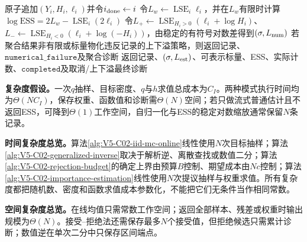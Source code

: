 \begin{AlgorithmContract}
\begin{algorithm}[t]
{  原子追加$(Y_i,H_i,\ell_i)$并令$i_{\rm done}\leftarrow i$\;
}
令$L_w\leftarrow\operatorname{LSE}_i\ell_i$，并在$L_w$有限时计算$\log\mathrm{ESS}=2L_w-\operatorname{LSE}_i(2\ell_i)$\;
令$L_+\leftarrow\operatorname{LSE}_{H_i>0}(\ell_i+\log H_i)$、$L_-\leftarrow\operatorname{LSE}_{H_i<0}(\ell_i+\log(-H_i))$，由稳定的有符号对数差得到$(\sigma,L_{\rm num})$\;
若聚合结果非有限或标量物化违反记录的上下溢策略，则返回记录、$\mathtt{numerical\_failure}$及聚合诊断\;
返回记录、$(\sigma,L_{\rm est})$、可表示标量、ESS、实际计数、$\mathtt{completed}$及取消/上下溢最终诊断\;
\end{algorithm}
\end{AlgorithmContract}
\FloatBarrier
{}
\endgroup

\textbf{复杂度假设。}一次$q$抽样、目标密度、$q$与$h$求值总成本为$C_I$。两种模式执行时间均为$\Theta(NC_I)$，保存权重、函数值和诊断需$\Theta(N)$空间；若只做流式普通估计且不返回ESS，可降到$\Theta(1)$工作空间，自归一化与ESS的稳定对数缩放通常保留$N$条记录。

\label{struct:V5-C02-CH26}
\begin{complexitybox}
\textbf{时间复杂度总览。}算法\ref{alg:V5-C02-iid-mc-online}线性使用$N$次目标抽样；算法\ref{alg:V5-C02-generalized-inverse}取决于解析逆、离散查找或数值二分；算法\ref{alg:V5-C02-rejection-budget}的确定上界由预算$B$控制、期望成本由$Nc$控制；算法\ref{alg:V5-C02-importance-estimation}线性使用$N$次提议抽样与权重求值。所有复杂度都把随机数、密度和函数求值成本参数化，不能把它们无条件当作相同常数。

\label{struct:V5-C02-CH27}
\textbf{空间复杂度总览。}在线均值只需常数工作空间；返回全部样本、残差或权重时输出规模为$\Theta(N)$。接受--拒绝法还需保存最多$N$个接受值，但拒绝候选只需累计诊断；数值逆在单次二分中只保存区间端点。
\end{complexitybox}

